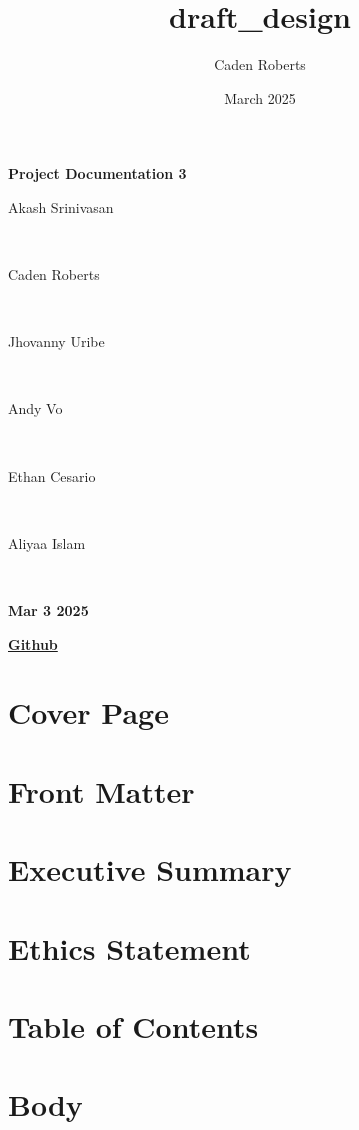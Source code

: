 \documentclass{article}
\title{draft_design}
\author{Caden Roberts}
\date{March 2025}
\begin{document}
\begin{titlepage}
    \centering
    \vfill
    {\Huge \bfseries Project Documentation 3\par}
    \vspace{1.5cm}
    {\Huge
        Akash Srinivasan \par \ \par
        Caden Roberts \par \ \par
        Jhovanny Uribe \par \ \par
        Andy Vo \par \ \par
        Ethan Cesario \par \ \par
        Aliyaa Islam \par \ \par
    }
    \vspace{1cm}
    {\Huge \bfseries Mar 3 2025\par}
    \vspace{1.5cm}
    \href{https://github.com/jhovuribe/Physical-Therapy-Hand-Rehabilitation-Device/}{\Huge \bfseries Github}
\end{titlepage}

\section{\bf{Cover Page}}


\section{\bf{Front Matter}}
\section{Executive Summary}

\section{Ethics Statement}

\section{Table of Contents}


\section{\bf{Body}}
\end{document}
